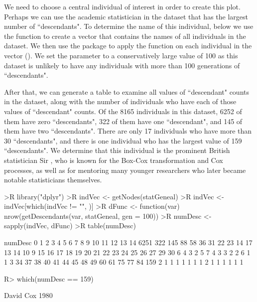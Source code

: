 \documentclass[article,shortnames]{jss}
\begin{document}
We need to choose a central individual of interest in order to create this plot. Perhaps we can use the academic statistician in the dataset that has the largest number of ``descendants". To determine the name of this individual, below we use the  function  to create a vector  that contains the names of all individuals in the dataset. We then use the  package to apply the  function  on each individual in the  vector (\citealt{dplyr}). We set the parameter  to a conservatively large value of 100 as this dataset is unlikely to have any individuals with more than 100 generations of ``descendants".

After that, we can generate a table to examine all values of ``descendant" counts in the dataset, along with the number of individuals who have each of those values of ``descendant" counts. Of the 8165 individuals in this dataset, 6252 of them have zero ``descendants", 322 of them have one ``descendant", and 145 of them have two ``descendants". There are only 17 individuals who have more than 30 ``descendants", and there is one individual who has the largest value of 159 ``descendants". We determine that this individual is the prominent British statistician Sir , who is known for the Box-Cox transformation and Cox processes, as well as for mentoring many younger researchers who later became notable statisticians themselves.

\begin{CodeChunk}
\begin{CodeInput}
>R library("dplyr")
>R indVec <- getNodes(statGeneal)
>R indVec <- indVec[which(indVec != "", )]
>R dFunc <- function(var) nrow(getDescendants(var, statGeneal, gen = 100))
>R numDesc <- sapply(indVec, dFunc)
>R table(numDesc)
\end{CodeInput}
\begin{CodeOutput}
numDesc
   0    1    2    3    4    5    6    7    8    9   10   11   12   13   14 
6251  322  145   88   58   36   31   22   23   14   17   13   14   10    9 
  15   16   17   18   19   20   21   22   23   24   25   26   27   29   30 
   6    4    3    2    5    7    4    3    3    2    2    6    1    1    3 
  34   37   38   40   41   44   45   48   49   60   61   75   77   84  159 
   2    1    1    1    1    1    1    1    2    1    1    1    1    1    1 
\end{CodeOutput}
\begin{CodeInput}
R> which(numDesc == 159)
\end{CodeInput}
\begin{CodeOutput}
David Cox 
     1980
\end{CodeOutput}
\end{CodeChunk}
\end{document}
